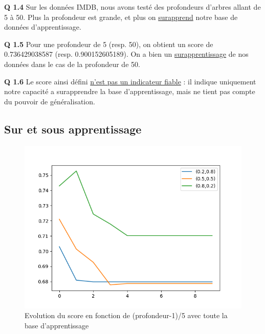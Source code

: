 \documentclass[a4paper]{article}
\begin{document}
\textbf{Q 1.4} Sur les données IMDB, nous avons testé des profondeurs d'arbres allant de 5 à 50. Plus la profondeur est grande, et plus on \underline{surapprend} notre base de données d'apprentissage.

\textbf{Q 1.5} Pour une profondeur de 5 (resp. 50), on obtient un score de 0.736429038587 (resp. 0.900152605189). On a bien un \underline{surapprentissage} de nos données dans le cas de la profondeur de 50.

\textbf{Q 1.6} Le score ainsi défini \underline{n'est pas un indicateur fiable} : il indique uniquement notre capacité a surapprendre la base d'apprentissage, mais ne tient pas compte du pouvoir de généralisation.

\subsection*{Sur et sous apprentissage}

\begin{figure}[ht!]
\begin{center}
\includegraphics[scale=0.5]{Figure_1}
\caption{Evolution du score en fonction de (profondeur-1)/5 avec toute la base d'apprentissage}
\label{apprentissage_prof1}
\end{center}
\end{figure}
\end{document}
